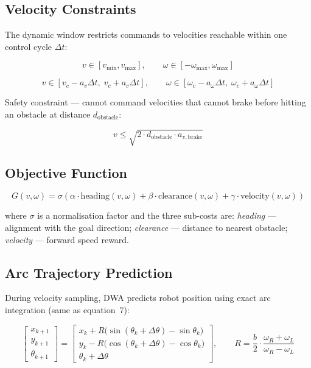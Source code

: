 \documentclass[12pt,a4paper]{article}
\begin{document}
\subsection{Velocity Constraints}

The dynamic window restricts commands to velocities reachable within
one control cycle $\Delta t$:

\begin{equation}
  v \in [v_{\min}, v_{\max}], \qquad
  \omega \in [-\omega_{\max}, \omega_{\max}]
  \tag{21}
\end{equation}

\begin{equation}
  v \in [v_c - a_v \Delta t,\; v_c + a_v \Delta t], \qquad
  \omega \in [\omega_c - a_\omega \Delta t,\; \omega_c + a_\omega \Delta t]
  \tag{22}
\end{equation}

Safety constraint --- cannot command velocities that cannot brake before
hitting an obstacle at distance $d_{\text{obstacle}}$:

\begin{equation}
  v \leq \sqrt{2 \cdot d_{\text{obstacle}} \cdot a_{v,\text{brake}}}
  \tag{23}
\end{equation}

\subsection{Objective Function}

\begin{equation}
  G(v,\omega) = \sigma\!\left(
    \alpha \cdot \text{heading}(v,\omega)
    + \beta  \cdot \text{clearance}(v,\omega)
    + \gamma \cdot \text{velocity}(v,\omega)
  \right)
  \tag{24}
\end{equation}

where $\sigma$ is a normalisation factor and the three sub-costs are:
\emph{heading} --- alignment with the goal direction;
\emph{clearance} --- distance to nearest obstacle;
\emph{velocity} --- forward speed reward.

\subsection{Arc Trajectory Prediction}

During velocity sampling, DWA predicts robot position using exact
arc integration (same as equation~7):

\begin{equation}
  \begin{bmatrix} x_{k+1} \\ y_{k+1} \\ \theta_{k+1} \end{bmatrix}
  =
  \begin{bmatrix}
    x_k + R\bigl(\sin(\theta_k + \Delta\theta) - \sin\theta_k\bigr) \\
    y_k - R\bigl(\cos(\theta_k + \Delta\theta) - \cos\theta_k\bigr) \\
    \theta_k + \Delta\theta
  \end{bmatrix},
  \qquad
  R = \frac{b}{2} \cdot \frac{\omega_R + \omega_L}{\omega_R - \omega_L}
  \tag{25}
\end{equation}
\end{document}
